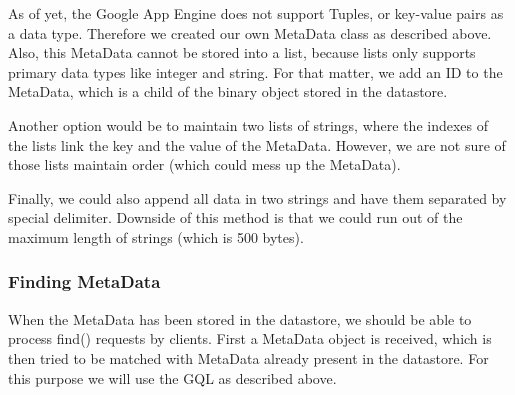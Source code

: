 As of yet, the Google App Engine does not support Tuples, or key-value pairs as a
data type. Therefore we created our own MetaData class as described above. Also,
this MetaData cannot be stored into a list, because lists only supports primary
data types like integer and string. For that matter, we add an ID to the
MetaData, which is a child of the binary object stored in the datastore.

Another option would be to maintain two lists of strings, where the indexes of
the lists link the key and the value of the MetaData. However, we are not sure of
those lists maintain order (which could mess up the MetaData).

Finally, we could also append all data in two strings and have them separated by
special delimiter. Downside of this method is that we could run out of the
maximum length of strings (which is 500 bytes).


\subsubsection{Finding MetaData}
When the MetaData has been stored in the datastore, we should be able to process
find() requests by clients. First a MetaData object is received, which is then
tried to be matched with MetaData already present in the datastore. For this
purpose we will use the GQL as described above.



